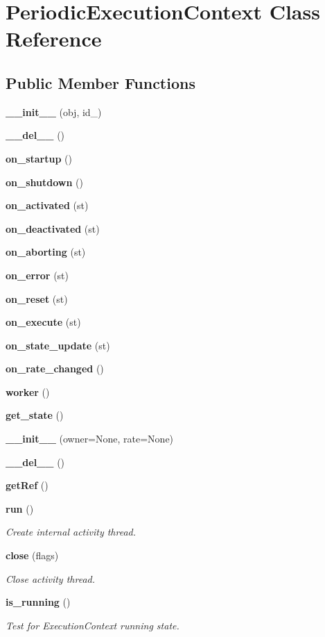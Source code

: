 \section{Periodic\-Execution\-Context Class Reference}
\label{classPeriodicExecutionContext}
\subsection*{Public Member Functions}
\begin{CompactItemize}
\item 
{\bf \_\-\_\-init\_\-\_\-} (obj, id\_\-)
\item 
{\bf \_\-\_\-del\_\-\_\-} ()
\item 
{\bf on\_\-startup} ()
\item 
{\bf on\_\-shutdown} ()
\item 
{\bf on\_\-activated} (st)
\item 
{\bf on\_\-deactivated} (st)
\item 
{\bf on\_\-aborting} (st)
\item 
{\bf on\_\-error} (st)
\item 
{\bf on\_\-reset} (st)
\item 
{\bf on\_\-execute} (st)
\item 
{\bf on\_\-state\_\-update} (st)
\item 
{\bf on\_\-rate\_\-changed} ()
\item 
{\bf worker} ()
\item 
{\bf get\_\-state} ()
\item 
{\bf \_\-\_\-init\_\-\_\-} (owner=None, rate=None)
\item 
{\bf \_\-\_\-del\_\-\_\-} ()
\item 
{\bf get\-Ref} ()
\item 
{\bf run} ()
\begin{CompactList}\small\item\em Create internal activity thread. \item\end{CompactList}\item 
{\bf close} (flags)
\begin{CompactList}\small\item\em Close activity thread. \item\end{CompactList}\item 
{\bf is\_\-running} ()
\begin{CompactList}\small\item\em Test for Execution\-Context running state. \item\end{CompactList}\item 

\end{CompactItemize}
